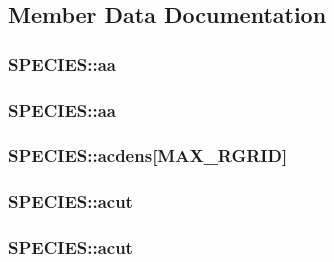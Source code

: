 \subsection{Member Data Documentation}
\hypertarget{struct_s_p_e_c_i_e_s_a327b3bfbfd30ddb525442d20213e7bf7}{
\subsubsection[{aa}]{ S\-P\-E\-C\-I\-E\-S\-::aa}}\label{struct_s_p_e_c_i_e_s_a327b3bfbfd30ddb525442d20213e7bf7}
\hypertarget{struct_s_p_e_c_i_e_s_a0d25c69d878e8929812c37c1c64ff140}{
\subsubsection[{aa}]{ S\-P\-E\-C\-I\-E\-S\-::aa}}\label{struct_s_p_e_c_i_e_s_a0d25c69d878e8929812c37c1c64ff140}
\hypertarget{struct_s_p_e_c_i_e_s_add57c5d86ad21ce6d7ae7368281198a5}{
\subsubsection[{acdens}]{ S\-P\-E\-C\-I\-E\-S\-::acdens\mbox{[}{\bf M\-A\-X\-\_\-\-R\-G\-R\-I\-D}\mbox{]}}}\label{struct_s_p_e_c_i_e_s_add57c5d86ad21ce6d7ae7368281198a5}
\hypertarget{struct_s_p_e_c_i_e_s_a3c96a5288805d6783a374484d066b36a}{
\subsubsection[{acut}]{ S\-P\-E\-C\-I\-E\-S\-::acut}}\label{struct_s_p_e_c_i_e_s_a3c96a5288805d6783a374484d066b36a}
\hypertarget{struct_s_p_e_c_i_e_s_a5b080aec19219ab3b459a99ec44a4a95}{
\subsubsection[{acut}]{ S\-P\-E\-C\-I\-E\-S\-::acut}}\label{struct_s_p_e_c_i_e_s_a5b080aec19219ab3b459a99ec44a4a95}
